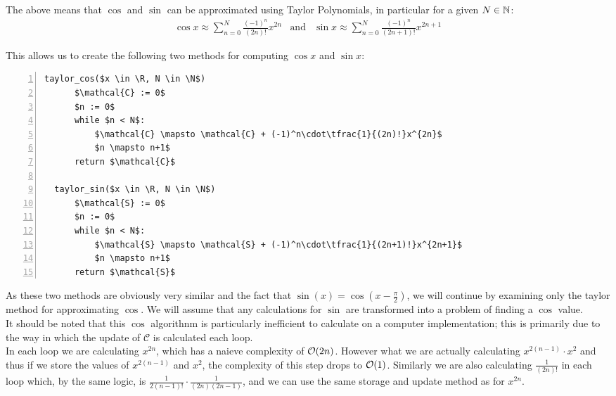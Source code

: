 {The above means that \(\cos\) and \(\sin\) can be approximated using Taylor Polynomials, in particular for a given \(N \in \mathbb{N}\):
\begin{displaymath}
\begin{array}{rcl}
	\cos x \approx \sum_{n=0}^N \frac{(-1)^n}{(2n)!}x^{2n}
	& \textrm{and}
	&\sin x\approx \sum_{n=0}^N \frac{(-1)^n}{(2n+1)!}x^{2n+1}
\end{array}
\end{displaymath}

This allows us to create the following two methods for computing \(\cos x\) and \(\sin x\):

\begin{lstlisting}[numbers=left,frame=single,mathescape,caption={Taylor computation of \(\cos\) and \(\sin\)},label={PCD_"Taylor Cos/Sin"}]
  taylor_cos($x \in \R, N \in \N$)
      $\mathcal{C} := 0$
      $n := 0$
      while $n < N$:
          $\mathcal{C} \mapsto \mathcal{C} + (-1)^n\cdot\tfrac{1}{(2n)!}x^{2n}$
          $n \mapsto n+1$
      return $\mathcal{C}$
  
  taylor_sin($x \in \R, N \in \N$)
      $\mathcal{S} := 0$
      $n := 0$
      while $n < N$:
          $\mathcal{S} \mapsto \mathcal{S} + (-1)^n\cdot\tfrac{1}{(2n+1)!}x^{2n+1}$
          $n \mapsto n+1$
      return $\mathcal{S}$
\end{lstlisting}

As these two methods are obviously very similar and the fact that \(\sin(x) = \cos(x - \frac{\pi}{2})\), we will continue by examining only the taylor method for approximating \(\cos\). We will assume that any calculations for \(\sin\) are transformed into a problem of finding a \(\cos\) value.\\

It should be noted that this \(\cos\) algorithnm is particularly inefficient to calculate on a computer implementation; this is primarily due to the way in which the update of \(\mathcal{C}\) is calculated each loop.\\

In each loop we are calculating \(x^{2n}\), which has a naieve complexity of \(\mathcal{O}(2n)\). However what we are actually calculating \(x^{2(n-1)}\cdot x^2\) and thus if we store the values of \(x^{2(n-1)}\) and \(x^2\), the complexity of this step drops to \(\mathcal{O}(1)\). Similarly we are also calculating \(\tfrac{1}{(2n)!}\) in each loop which, by the same logic, is \(\tfrac{1}{2(n-1)!} \cdot \tfrac{1}{(2n)(2n-1)}\), and we can use the same storage and update method as for \(x^{2n}\).\\

}
